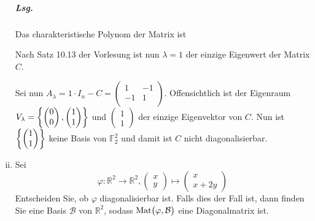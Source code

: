 \documentclass{scrreprt}
\begin{document}
\begin{enumerate}[(i)]
  \subparagraph{Lsg.} Das charakteristische Polynom der Matrix ist
  Nach Satz 10.13 der Vorlesung ist nun $\lambda = 1$ der einzige
  Eigenwert der Matrix $C$.

  Sei nun $A_{\lambda} = 1 \cdot I_n - C = \begin{pmatrix}
    1 & -1 \\
    -1 & 1 \\
  \end{pmatrix}$.
  Offensichtlich ist der Eigenraum $V_{\lambda} = \qty{
    \begin{pmatrix}0\\0\end{pmatrix}, \begin{pmatrix}1\\1\end{pmatrix}}$ und
  $\begin{pmatrix}1\\1\end{pmatrix}$ der einzige Eigenvektor von $C$.
  Nun ist $\qty{\begin{pmatrix}1\\1\end{pmatrix}}$ keine Basis von
  $\mathbb{F}_2^2$ und damit ist $C$ nicht diagonalisierbar.

\item Sei
  \[
    \varphi \colon \mathbb{R}^2 \to \mathbb{R}^2,
    \begin{pmatrix}x\\y\end{pmatrix} \mapsto
    \begin{pmatrix}x\\x + 2y\end{pmatrix}
  \]
  Entscheiden Sie, ob $\varphi$ diagonalisierbar ist.
  Falls dies der Fall ist, dann finden Sie eine Basis $\mathcal{B}$ von
  $\mathbb{R}^2$, sodass $\text{Mat}\qty\big(\varphi, \mathcal{B})$ eine
  Diagonalmatrix ist.


\end{enumerate}
\end{document}
